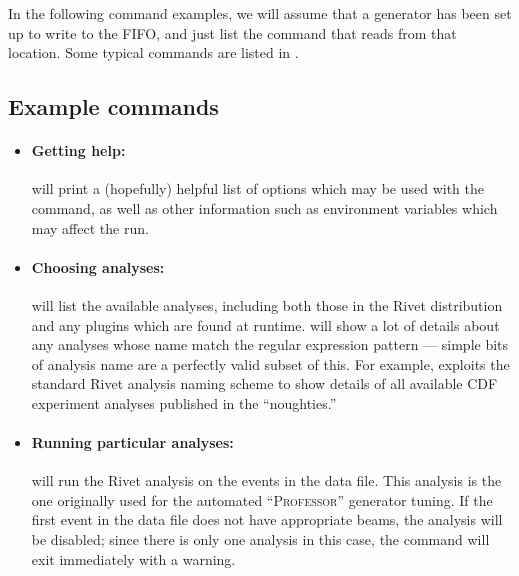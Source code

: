 \documentclass{JHEP3}
\begin{document}
In the following command examples, we will assume that a generator has been set
up to write to the  FIFO, and just list the  command
that reads from that location. Some typical  commands are
listed in .


\subsection{Example  commands}

\begin{itemize}

\item \paragraph{Getting help:}{ will print a (hopefully)
    helpful list of options which may be used with the  command, as
    well as other information such as environment variables which may affect the
    run.}

\item \paragraph{Choosing analyses:}{ will list the
    available analyses, including both those in the Rivet distribution and any
    plugins which are found at runtime. 
    will show a lot of details about any analyses whose name match the
     regular expression pattern --- simple bits of analysis name are a
    perfectly valid subset of this. For example,  exploits the standard Rivet analysis naming scheme to show
    details of all available CDF experiment analyses published in the
    ``noughties.''}

\item \paragraph{Running particular analyses:}{ will run the Rivet \cite{Abreu:1996na}
    analysis on the events in the  data file. This analysis is the
    one originally used for the \Delphi automated ``\textsc{Professor}''
    generator tuning.  If the first event in the data file does not have
    appropriate beams, the analysis will be disabled; since there is only one
    analysis in this case, the command will exit immediately with a warning.}


\end{itemize}
\end{document}
